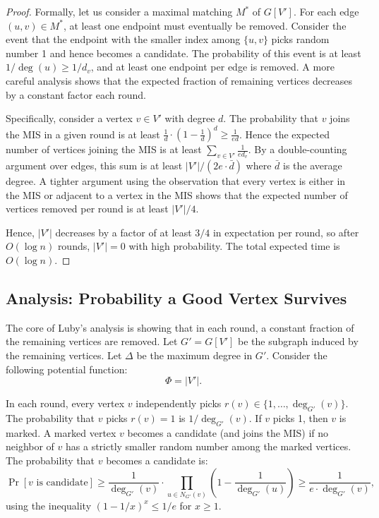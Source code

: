 \documentclass[twoside,12pt]{book}
\theoremstyle{plain}
\theoremstyle{definition}
\theoremstyle{remark}
\begin{document}
\begin{proof}
Formally, let us consider a maximal matching $M^*$ of $G[V']$. For each edge $(u,v) \in M^*$, at least one endpoint must eventually be removed. Consider the event that the endpoint with the smaller index among $\{u, v\}$ picks random number 1 and hence becomes a candidate. The probability of this event is at least $1/\deg(u) \geq 1/d_v$, and at least one endpoint per edge is removed. A more careful analysis shows that the expected fraction of remaining vertices decreases by a constant factor each round.

Specifically, consider a vertex $v \in V'$ with degree $d$. The probability that $v$ joins the MIS in a given round is at least $\frac{1}{d} \cdot \left(1 - \frac{1}{d}\right)^d \geq \frac{1}{ed}$. Hence the expected number of vertices joining the MIS is at least $\sum_{v \in V'} \frac{1}{ed_v}$. By a double-counting argument over edges, this sum is at least $|V'|/(2e \cdot \bar{d})$ where $\bar{d}$ is the average degree. A tighter argument using the observation that every vertex is either in the MIS or adjacent to a vertex in the MIS shows that the expected number of vertices removed per round is at least $|V'|/4$.

Hence, $|V'|$ decreases by a factor of at least $3/4$ in expectation per round, so after $O(\log n)$ rounds, $|V'| = 0$ with high probability. The total expected time is $O(\log n)$.
\end{proof}

\subsection{Analysis: Probability a Good Vertex Survives}
\label{subsec:mis-analysis}

The core of Luby's analysis is showing that in each round, a constant fraction of the remaining vertices are removed. Let $G' = G[V']$ be the subgraph induced by the remaining vertices. Let $\Delta$ be the maximum degree in $G'$. Consider the following potential function:
\[
\Phi = |V'|.
\]

In each round, every vertex $v$ independently picks $r(v) \in \{1, \ldots, \deg_{G'}(v)\}$. The probability that $v$ picks $r(v) = 1$ is $1/\deg_{G'}(v)$. If $v$ picks 1, then $v$ is marked. A marked vertex $v$ becomes a candidate (and joins the MIS) if no neighbor of $v$ has a strictly smaller random number among the marked vertices. The probability that $v$ becomes a candidate is:
\[
\Pr[v \text{ is candidate}] \geq \frac{1}{\deg_{G'}(v)} \cdot \prod_{u \in N_{G'}(v)} \left(1 - \frac{1}{\deg_{G'}(u)}\right) \geq \frac{1}{e \cdot \deg_{G'}(v)},
\]
using the inequality $(1 - 1/x)^x \leq 1/e$ for $x \geq 1$.
\end{document}
